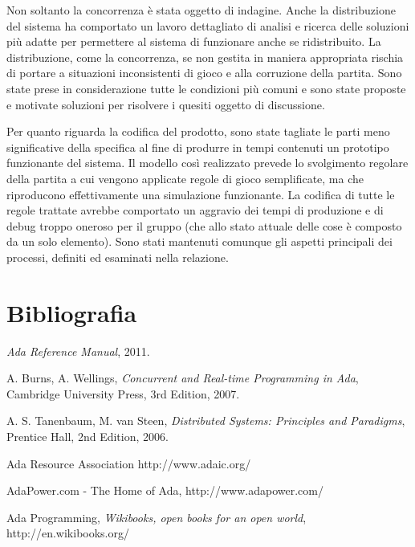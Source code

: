\documentclass[aps,letterpaper,10pt]{article}
\begin{document}
Non soltanto la concorrenza \`e stata oggetto di indagine. Anche la distribuzione del sistema ha comportato un lavoro
dettagliato di analisi e ricerca delle soluzioni pi\`u adatte per permettere al sistema di funzionare anche se
ridistribuito. La distribuzione, come la concorrenza, se non gestita in maniera appropriata rischia di portare a
situazioni inconsistenti di gioco e alla corruzione della partita. Sono state prese in considerazione tutte le
condizioni pi\`u comuni e sono state proposte e motivate soluzioni per risolvere i quesiti oggetto di discussione.
\vspace{3mm}

Per quanto riguarda la codifica del prodotto, sono state tagliate le parti meno significative della specifica al fine di
produrre in tempi contenuti un prototipo funzionante del sistema. Il modello cos\`i realizzato prevede lo svolgimento
regolare della partita a cui vengono applicate regole di gioco semplificate, ma che riproducono effettivamente una
simulazione funzionante. La codifica di tutte le regole trattate avrebbe comportato un aggravio dei tempi di produzione
e di debug troppo oneroso per il gruppo (che allo stato attuale delle cose \`e composto da un solo elemento). Sono stati
mantenuti comunque gli aspetti principali dei processi, definiti ed esaminati nella relazione.

\newpage

\section{Bibliografia}

\begin{thebibliography}{99}

\emph{Ada Reference Manual},
2011.

A. Burns, A. Wellings,
\emph{Concurrent and Real-time Programming in Ada},
Cambridge University Press,
3rd Edition,
2007.

A. S. Tanenbaum, M. van Steen,
\emph{Distributed Systems: Principles and Paradigms},
Prentice Hall,
2nd Edition,
2006.

Ada Resource Association
http://www.adaic.org/

AdaPower.com - The Home of Ada,
http://www.adapower.com/

Ada Programming, 
\emph{Wikibooks, open books for an open world}, 
http://en.wikibooks.org/

\end{thebibliography}
\end{document}
